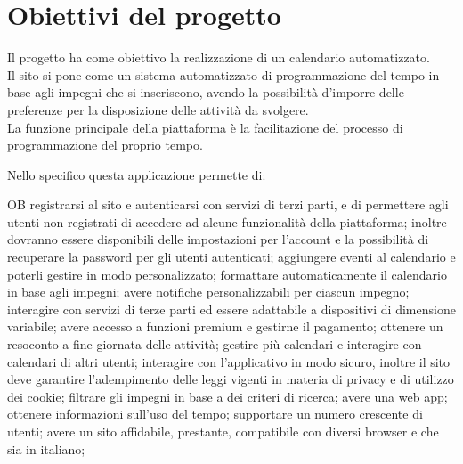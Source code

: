 \section{Obiettivi del progetto}
\label{sec:ObiettiviProgetto}
Il progetto ha come obiettivo la realizzazione di un calendario automatizzato.\\
Il sito si pone come un sistema automatizzato di programmazione del tempo in base agli impegni che si inseriscono, avendo la possibilità d'imporre delle preferenze per la disposizione delle attività da svolgere.\\
La funzione principale della piattaforma è la facilitazione del processo di programmazione del proprio tempo.

\vspace{0.5cm}

Nello specifico questa applicazione permette di:
\begin{listaPersonale}{OB}
       registrarsi al sito e autenticarsi con servizi di terzi parti, e di permettere agli utenti non registrati di accedere ad alcune funzionalità della piattaforma; inoltre dovranno essere disponibili delle impostazioni per l'account e la possibilità di recuperare la password per gli utenti autenticati;
       aggiungere eventi al calendario e poterli gestire in modo personalizzato;
       formattare automaticamente il calendario in base agli impegni;
       avere notifiche personalizzabili per ciascun impegno;
       interagire con servizi di terze parti ed essere adattabile a dispositivi di dimensione variabile;
       avere accesso a funzioni premium e gestirne il pagamento;
       ottenere un resoconto a fine giornata delle attività;
       gestire più calendari e interagire con calendari di altri utenti;
       interagire con l'applicativo in modo sicuro, inoltre il sito deve garantire l'adempimento delle leggi vigenti in materia di privacy e di utilizzo dei cookie;
       filtrare gli impegni in base a dei criteri di ricerca;
       avere una web app;
       ottenere informazioni sull'uso del tempo;
       supportare un numero crescente di utenti;
       avere un sito affidabile, prestante, compatibile con diversi browser e che sia in italiano;
\end{listaPersonale}
